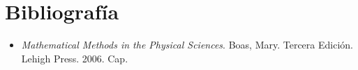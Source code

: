 \documentclass{article}
\begin{document}
\section*{Bibliografía}
\begin{itemize}
    \item \textit{Mathematical Methods in the Physical Sciences}. Boas, Mary. Tercera Edición. Lehigh Press. 2006. Cap.
\end{itemize}
\end{document}
